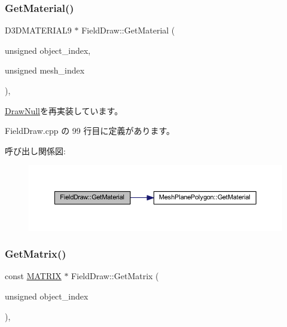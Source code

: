 \subsubsection{\texorpdfstring{Get\+Material()}{GetMaterial()}}
{\footnotesize\ttfamily D3\+D\+M\+A\+T\+E\+R\+I\+A\+L9 $\ast$ Field\+Draw\+::\+Get\+Material (\begin{DoxyParamCaption}\item[{unsigned}]{object\+\_\+index,  }\item[{unsigned}]{mesh\+\_\+index }\end{DoxyParamCaption})\hspace{0.3cm}{\ttfamily [override]}, {\ttfamily [virtual]}}



\mbox{\hyperlink{class_draw_null_a84969d22d3436986f214e9896fe44fc6}{Draw\+Null}}を再実装しています。



 Field\+Draw.\+cpp の 99 行目に定義があります。

呼び出し関係図\+:\nopagebreak
\begin{figure}[H]
\begin{center}
\leavevmode
\includegraphics[width=350pt]{class_field_draw_ab126f938895211ff170bc37045a8e7a2_cgraph}
\end{center}
\end{figure}
\mbox{\label{class_field_draw_a2629b4c4cd8e240e39c65b879c6e82b6}} 
\subsubsection{\texorpdfstring{Get\+Matrix()}{GetMatrix()}}
{\footnotesize\ttfamily const \mbox{\hyperlink{_vector3_d_8h_a032295cd9fb1b711757c90667278e744}{M\+A\+T\+R\+IX}} $\ast$ Field\+Draw\+::\+Get\+Matrix (\begin{DoxyParamCaption}\item[{unsigned}]{object\+\_\+index }\end{DoxyParamCaption})\hspace{0.3cm}{\ttfamily [override]}, {\ttfamily [virtual]}}



